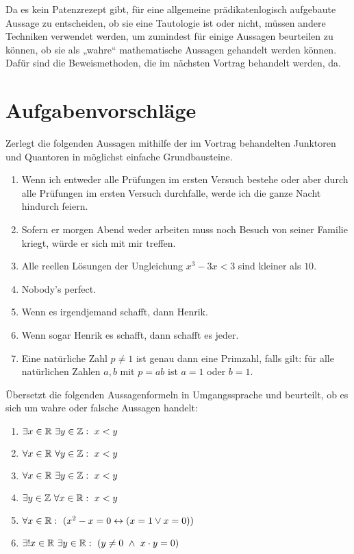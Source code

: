 \begin{vorschau}
    Da es kein Patenzrezept gibt, für eine allgemeine prädikatenlogisch aufgebaute Aussage zu entscheiden, ob sie eine Tautologie ist oder nicht, müssen andere Techniken verwendet werden, um zumindest für einige Aussagen beurteilen zu können, ob sie als „wahre“ mathematische Aussagen gehandelt werden können. Dafür sind die Beweismethoden, die im nächsten Vortrag behandelt werden, da.
\end{vorschau}





\clearpage
\section{Aufgabenvorschläge}


\begin{aufg}
    Zerlegt die folgenden Aussagen mithilfe der im Vortrag behandelten Junktoren und Quantoren in möglichst einfache Grundbausteine.
    \begin{enumerate}
        \item Wenn ich entweder alle Prüfungen im ersten Versuch bestehe oder aber durch alle Prüfungen im ersten Versuch durchfalle, werde ich die ganze Nacht hindurch feiern.
        \item Sofern er morgen Abend weder arbeiten muss noch Besuch von seiner Familie kriegt, würde er sich mit mir treffen.
        \item Alle reellen Lösungen der Ungleichung $x^3-3x<3$ sind kleiner als $10$.
        \item Nobody’s perfect.
        \item Wenn es irgendjemand schafft, dann Henrik.
        \item Wenn sogar Henrik es schafft, dann schafft es jeder.
        \item Eine natürliche Zahl $p\neq 1$ ist genau dann eine Primzahl, falls gilt: für alle natürlichen Zahlen $a,b$ mit $p=ab$ ist $a=1$ oder $b=1$.
    \end{enumerate}
\end{aufg}


\begin{aufg}
    Übersetzt die folgenden Aussagenformeln in Umgangssprache und beurteilt, ob es sich um wahre oder falsche Aussagen handelt:
    \begin{enumerate}
	\item $\exists x\in \R\ \exists y\in \Z:\ x<y$
	\item $\forall x\in \R\ \forall y\in \Z:\ x<y$
        \item $\forall x\in \R\ \exists y\in \Z:\ x<y$
        \item $\exists y\in \Z\ \forall x\in \R:\ x<y$
        \item $\forall x\in \mathbb R:\ (x^2 -x=0\leftrightarrow(x=1\vee x=0))$
        \item $\exists! x\in \R\ \exists y\in \R:\ (y\neq0\ \land\ x\cdot y=0)$
    \end{enumerate}
\end{aufg}
	
